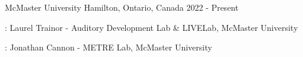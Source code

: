 

\begin{cventries}

  \cventry
    {} %
    {McMaster University} %
    {Hamilton, Ontario, Canada} %
    { 2022 - Present}%
    {%
      \begin{cvitems} %
        \item {}: Laurel Trainor - 
          Auditory Development Lab \& LIVELab, McMaster University
      \item {}: Jonathan Cannon - 
          METRE Lab, McMaster University
      \end{cvitems}
    }


\end{cventries}
